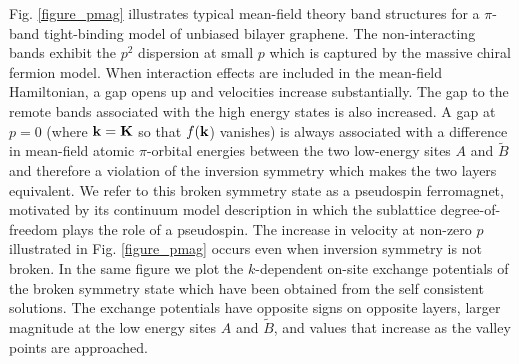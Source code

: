 \documentclass[twocolumn,prb,showpacs,preprintnumbers,amsmath,amssymb]{revtex4}
\begin{document}
Fig. \ref{figure_pmag} illustrates typical mean-field theory band structures for a 
$\pi$-band tight-binding model of unbiased bilayer graphene.
The non-interacting bands exhibit the $p^2$ dispersion at small $p$
which is captured by the massive chiral fermion model.  When interaction effects 
are included in the mean-field Hamiltonian, a gap opens up 
and velocities increase substantially.  The gap to the remote bands associated with the 
high energy states is also increased.  A gap at $p=0$ (where $\bf{k}=K$ so that $f({\bf k}$) vanishes) 
is always associated with a difference in mean-field atomic $\pi$-orbital energies between the two low-energy 
sites $A$ and $\tilde{B}$ and therefore a violation of the inversion symmetry 
which makes the two layers equivalent.  We refer to this broken symmetry state as a 
pseudospin ferromagnet, motivated by its continuum model description \cite{pmag}
in which the sublattice degree-of-freedom plays the role of a pseudospin.  
The increase in velocity at non-zero $p$ illustrated in Fig. \ref{figure_pmag} occurs even when inversion
symmetry is not broken\cite{polinissc}.
In the same figure we plot the
$k$-dependent on-site exchange potentials of the broken symmetry state 
which have been
obtained from the self consistent solutions.  The exchange potentials have
opposite signs on opposite layers,  
larger magnitude at the low energy sites $A$ and $\widetilde{B}$, 
and values that increase as the valley points are approached.
\end{document}
